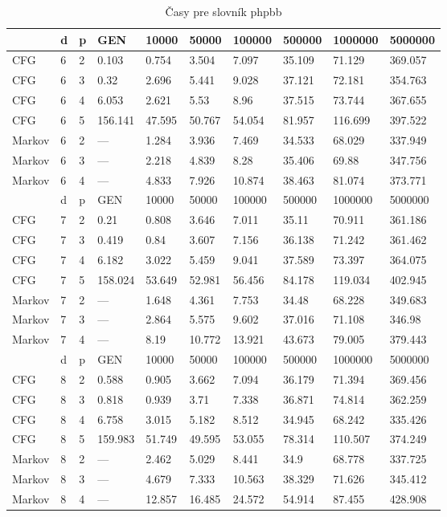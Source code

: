\begin{table}[]
\centering
\caption{Časy pre slovník phpbb}
\label{tphpbb}
\begin{tabular}{lll|lllllll}
       & d & p & GEN     & 10000  & 50000  & 100000 & 500000 & 1000000 & 5000000 \\ \hline
CFG    & 6 & 2 & 0.103   & 0.754  & 3.504  & 7.097  & 35.109 & 71.129  & 369.057 \\
CFG    & 6 & 3 & 0.32    & 2.696  & 5.441  & 9.028  & 37.121 & 72.181  & 354.763 \\
CFG    & 6 & 4 & 6.053   & 2.621  & 5.53   & 8.96   & 37.515 & 73.744  & 367.655 \\
CFG    & 6 & 5 & 156.141 & 47.595 & 50.767 & 54.054 & 81.957 & 116.699 & 397.522 \\
Markov & 6 & 2 & ---     & 1.284  & 3.936  & 7.469  & 34.533 & 68.029  & 337.949 \\
Markov & 6 & 3 & ---     & 2.218  & 4.839  & 8.28   & 35.406 & 69.88   & 347.756 \\
Markov & 6 & 4 & ---     & 4.833  & 7.926  & 10.874 & 38.463 & 81.074  & 373.771 \\ \hline
       & d & p & GEN     & 10000  & 50000  & 100000 & 500000 & 1000000 & 5000000 \\ \hline
CFG    & 7 & 2 & 0.21    & 0.808  & 3.646  & 7.011  & 35.11  & 70.911  & 361.186 \\
CFG    & 7 & 3 & 0.419   & 0.84   & 3.607  & 7.156  & 36.138 & 71.242  & 361.462 \\
CFG    & 7 & 4 & 6.182   & 3.022  & 5.459  & 9.041  & 37.589 & 73.397  & 364.075 \\
CFG    & 7 & 5 & 158.024 & 53.649 & 52.981 & 56.456 & 84.178 & 119.034 & 402.945 \\
Markov & 7 & 2 & ---     & 1.648  & 4.361  & 7.753  & 34.48  & 68.228  & 349.683 \\
Markov & 7 & 3 & ---     & 2.864  & 5.575  & 9.602  & 37.016 & 71.108  & 346.98  \\
Markov & 7 & 4 & ---     & 8.19   & 10.772 & 13.921 & 43.673 & 79.005  & 379.443 \\ \hline
       & d & p & GEN     & 10000  & 50000  & 100000 & 500000 & 1000000 & 5000000 \\ \hline
CFG    & 8 & 2 & 0.588   & 0.905  & 3.662  & 7.094  & 36.179 & 71.394  & 369.456 \\
CFG    & 8 & 3 & 0.818   & 0.939  & 3.71   & 7.338  & 36.871 & 74.814  & 362.259 \\
CFG    & 8 & 4 & 6.758   & 3.015  & 5.182  & 8.512  & 34.945 & 68.242  & 335.426 \\
CFG    & 8 & 5 & 159.983 & 51.749 & 49.595 & 53.055 & 78.314 & 110.507 & 374.249 \\
Markov & 8 & 2 & ---     & 2.462  & 5.029  & 8.441  & 34.9   & 68.778  & 337.725 \\
Markov & 8 & 3 & ---     & 4.679  & 7.333  & 10.563 & 38.329 & 71.626  & 345.412 \\
Markov & 8 & 4 & ---     & 12.857 & 16.485 & 24.572 & 54.914 & 87.455  & 428.908
\end{tabular}
\end{table}

